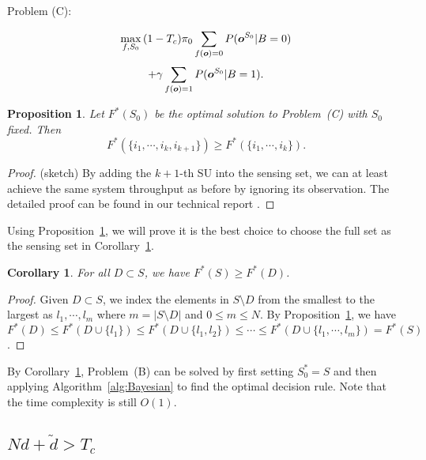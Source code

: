 \documentclass[conference]{IEEEtran}
\newtheorem{proposition}[theorem]{Proposition}
\newtheorem{corollary}[theorem]{Corollary}
\begin{document}
Problem (C):
\vspace{-0.8em}

\[\max\limits_{f,S_0}{(1-T_c){\pi}_0 \sum\limits_{f(\boldsymbol{o})=0}{P(\boldsymbol{o}^{S_0}|B=0)}}
\vspace{-0.5em}\]
\[+\gamma \sum\limits_{f(\boldsymbol{o})=1}{P(\boldsymbol{o}^{S_0}|B=1)}.
\vspace{-0.5em}\]


\begin{proposition}
\label{prop:more_better}
Let $F^*(S_0)$ be the optimal solution to Problem~(C) with $S_0$ fixed. Then 
\vspace{-0.3em}
\begin{equation}
F^*(\{i_1,\cdots,i_k,i_{k+1}\}) \ge F^*(\{i_1,\cdots,i_k\}).
\end{equation}
\end{proposition}

\begin{proof}
(sketch) By adding the $k+1$-th SU into the sensing set, we can at least achieve the same system throughput as before by ignoring its observation. The detailed proof can be found in our technical report \cite{Li2011}.
\end{proof}




Using Proposition~\ref{prop:more_better}, we will prove it is the best choice to choose the full set as the sensing set in Corollary~\ref{cor:full_best}.

\begin{corollary}
\label{cor:full_best}
For all $D\subset S$, we have $F^*(S) \ge F^*(D)$.
\end{corollary}

\begin{proof}
Given $D\subset S$, we index the elements in $S\setminus D$ from the smallest to the largest as $l_1,\cdots,l_m$ where $m=|S\setminus D|$ and $0\le m \le N$. By Proposition~\ref{prop:more_better}, we have $F^*(D)\le F^*(D\cup \{l_1\})\le F^*(D\cup \{l_1,l_2\})\le \cdots \le F^*(D\cup \{l_1,\cdots, l_m\})=F^*(S)$.
\end{proof}

By Corollary~\ref{cor:full_best}, Problem~(B) can be solved by first setting $S_0^*=S$ and then applying Algorithm~\ref{alg:Bayesian} to find the optimal decision rule. Note that the time complexity is still $O(1)$.

\subsection{$Nd+\tilde{d}> T_c$}
\label{subsec:exhaustive}
\end{document}
